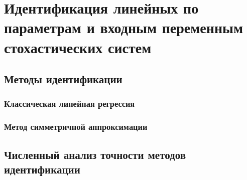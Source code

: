 \chapter[Идентификация линейных по параметрам и \\ входным переменным стохастических систем]{%
  Идентификация линейных по параметрам и
  входным переменным стохастических систем
}

\section{Методы идентификации}

\subsection{Классическая линейная регрессия}

\subsection{Метод симметричной аппроксимации}

\section{Численный анализ точности методов идентификации}
